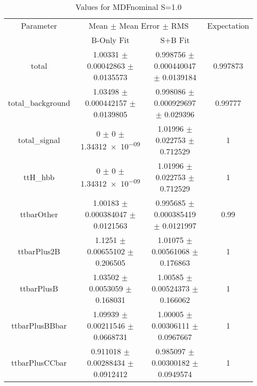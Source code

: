 \begin{table}
\centering
\caption{Values for MDFnominal S=1.0}
\begin{tabular}{cccc}
\toprule
Parameter & \multicolumn{2}{c}{Mean $\pm$ Mean Error $\pm$ RMS} & Expectation\\
 & B-Only Fit & S+B Fit & \\
\midrule
total & \num{1.00331} $\pm$ \num{0.00042863} $\pm$ \num{0.0135573} & \num{0.998756} $\pm$ \num{0.000440047} $\pm$ \num{0.0139184} & \num{0.997873}\\
total\_background & \num{1.03498} $\pm$ \num{0.000442157} $\pm$ \num{0.0139805} & \num{0.998086} $\pm$ \num{0.000929697} $\pm$ \num{0.029396} & \num{0.99777}\\
total\_signal & \num{0} $\pm$ \num{0} $\pm$ \num{1.34312e-09} & \num{1.01996} $\pm$ \num{0.022753} $\pm$ \num{0.712529} & \num{1}\\
ttH\_hbb & \num{0} $\pm$ \num{0} $\pm$ \num{1.34312e-09} & \num{1.01996} $\pm$ \num{0.022753} $\pm$ \num{0.712529} & \num{1}\\
ttbarOther & \num{1.00183} $\pm$ \num{0.000384047} $\pm$ \num{0.0121563} & \num{0.995685} $\pm$ \num{0.000385419} $\pm$ \num{0.0121997} & \num{0.99}\\
ttbarPlus2B & \num{1.1251} $\pm$ \num{0.00655102} $\pm$ \num{0.206505} & \num{1.01075} $\pm$ \num{0.00561068} $\pm$ \num{0.176863} & \num{1}\\
ttbarPlusB & \num{1.03502} $\pm$ \num{0.0053059} $\pm$ \num{0.168031} & \num{1.00585} $\pm$ \num{0.00524373} $\pm$ \num{0.166062} & \num{1}\\
ttbarPlusBBbar & \num{1.09939} $\pm$ \num{0.00211546} $\pm$ \num{0.0668731} & \num{1.00005} $\pm$ \num{0.00306111} $\pm$ \num{0.0967667} & \num{1}\\
ttbarPlusCCbar & \num{0.911018} $\pm$ \num{0.00288434} $\pm$ \num{0.0912412} & \num{0.985097} $\pm$ \num{0.00300182} $\pm$ \num{0.0949574} & \num{1}\\
\bottomrule
\end{tabular}
\end{table}